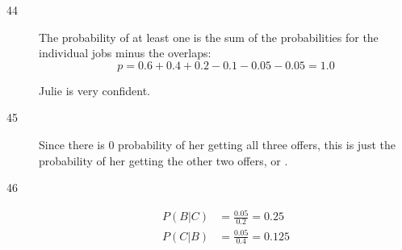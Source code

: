 \documentclass[letterpaper, landscape]{exam}
\begin{document}
\begin{description}



    \item[44]
      The probability of at least one is the sum of the probabilities for the individual
      jobs minus the overlaps:
        \[
          p = 0.6 + 0.4 + 0.2 - 0.1 - 0.05 - 0.05 = \boxed{ 1.0 }
        \]

        Julie is very confident.

    \item[45]
      Since there is 0 probability of her getting all three offers, this is just the
      probability of her getting the other two offers, or .

    \item[46]
      \begin{align*}
        P(B|C) &= \frac{0.05}{0.2} = \boxed{ 0.25 } \\
        P(C|B) &= \frac{0.05}{0.4} = \boxed{ 0.125 } \\
      \end{align*}





\end{description}
\end{document}
